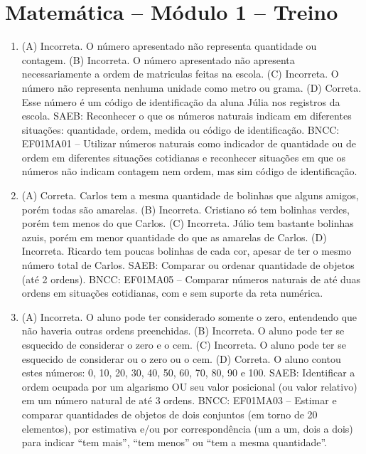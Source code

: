 \pagebreak
\pagestyle{plain}
\footnotesize

\pagecolor{gray!40}

\section*{Matemática – Módulo 1 – Treino}

\begin{enumerate}
\item
(A) Incorreta. O número apresentado não representa quantidade ou contagem.
(B) Incorreta. O número apresentado não apresenta necessariamente a ordem de matriculas feitas na escola.
(C) Incorreta. O número não representa nenhuma unidade como metro ou grama.
(D) Correta. Esse número é um código de identificação da aluna Júlia nos registros da escola.
SAEB: Reconhecer o que os números naturais indicam em diferentes
situações: quantidade, ordem, medida ou código de identificação.
BNCC: EF01MA01 -- Utilizar números naturais como indicador de quantidade
ou de ordem em diferentes situações cotidianas e reconhecer situações em
que os números não indicam contagem nem ordem, mas sim código de
identificação.

\item
(A) Correta. Carlos tem a mesma quantidade de bolinhas que alguns amigos, porém todas são amarelas.
(B) Incorreta. Cristiano só tem bolinhas verdes, porém tem menos do que Carlos.
(C) Incorreta. Júlio tem bastante bolinhas azuis, porém em menor quantidade do que as amarelas de Carlos.
(D) Incorreta. Ricardo tem poucas bolinhas de cada cor, apesar de ter o mesmo número total de Carlos.
SAEB: Comparar ou ordenar quantidade de objetos (até 2 ordens).
BNCC: EF01MA05 -- Comparar números naturais de até duas ordens em
situações cotidianas, com e sem suporte da reta numérica.

\item
(A)  Incorreta. O aluno pode ter considerado somente o zero, entendendo que não haveria outras ordens preenchidas.
(B)  Incorreta. O aluno pode ter se esquecido de considerar o zero e o cem.
(C)  Incorreta. O aluno pode ter se esquecido de considerar ou o zero ou o cem.
(D)  Correta. O aluno contou estes números: 0, 10, 20, 30, 40, 50, 60, 70, 80, 90 e 100.
SAEB: Identificar a ordem ocupada por um algarismo OU seu valor
posicional (ou valor relativo) em um número natural de até 3 ordens.
BNCC: EF01MA03 -- Estimar e comparar quantidades de objetos de dois
conjuntos (em torno de 20 elementos), por estimativa e/ou por
correspondência (um a um, dois a dois) para indicar ``tem mais'', ``tem
menos'' ou ``tem a mesma quantidade''.
\end{enumerate}

